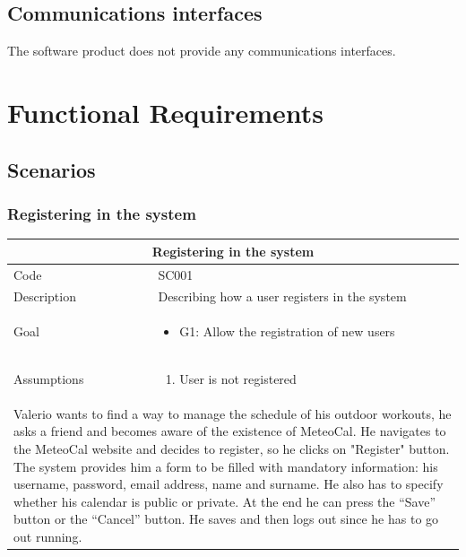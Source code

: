 \documentclass[10pt,a4paper,titlepage]{article}
\begin{document}
\subsection{Communications interfaces}
The software product does not provide any communications interfaces.

\section{Functional Requirements}
\subsection{Scenarios}

\subsubsection{Registering in the system }
\begin{tabular}{| p{3cm} | p{10cm} |}
\hline \multicolumn{2}{|c|}{\textbf{Registering in the system }} \\ 
\hline Code        & SC001 \\ 
\hline Description & Describing how a user registers in the system \\
\hline Goal        & \begin{itemize}\item G1: Allow the registration of new users\end{itemize}\\
\hline Assumptions & \begin{enumerate} \item User is not registered \end{enumerate} \\
\hline \multicolumn{2}{|p{13cm}|}{Valerio wants to find a way to manage the schedule of his outdoor workouts, he asks a friend and becomes aware of the existence of MeteoCal. He navigates to the MeteoCal website and decides to register, so he clicks on "Register" button. The system provides him a form to be filled with mandatory information: his username, password, email address, name and surname. He also has to specify whether his calendar is public or private. At the end he can press the “Save” button or the “Cancel” button. He saves and then logs out since he has to go out running.}\\
\hline
\end{tabular}
\end{document}
